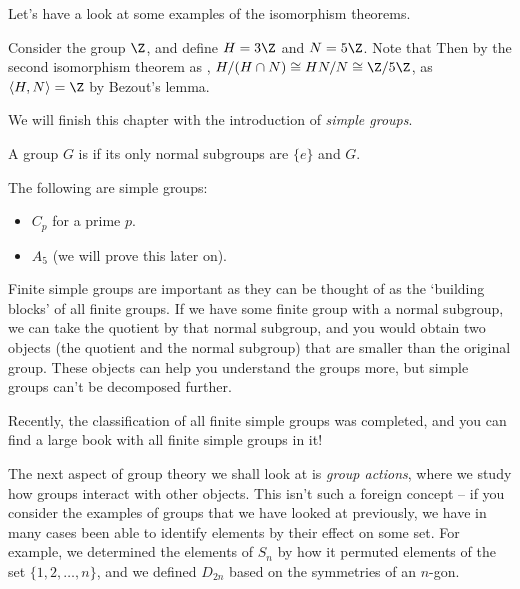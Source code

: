 Let's have a look at some examples of the isomorphism theorems.

\begin{example}
	Consider the group $\Z$, and define $H = 3\Z$ and $N = 5\Z$. Note that 
	Then by the second isomorphism theorem as , $H/(H \cap N) \cong HN/N \cong \Z/5\Z$, as $\langle H, N \rangle = \Z$ by Bezout's lemma.
\end{example}



We will finish this chapter with the introduction of \emph{simple groups}.

\begin{definition}
	A group $G$ is  if its only normal subgroups are $\{e\}$ and $G$.
\end{definition}

\begin{example}
The following are simple groups:
\begin{itemize}
	\item $C_p$ for a prime $p$.
	\item $A_5$ (we will prove this later on).
\end{itemize}	
\end{example}

Finite simple groups are important as they can be thought of as the `building blocks' of all finite groups. If we have some finite group with a normal subgroup, we can take the quotient by that normal subgroup, and you would obtain two objects (the quotient and the normal subgroup) that are smaller than the original group. These objects can help you understand the groups more, but simple groups can't be decomposed further.

Recently, the classification of all finite simple groups was completed, and you can find a large book with all finite simple groups in it!


The next aspect of group theory we shall look at is \emph{group actions}, where we study how groups interact with other objects. This isn't such a foreign concept -- if you consider the examples of groups that we have looked at previously, we have in many cases been able to identify elements by their effect on some set. For example, we determined the elements of $S_n$ by how it permuted elements of the set $\{1, 2, \dots, n\}$, and we defined $D_{2n}$ based on the symmetries of an $n$-gon.

